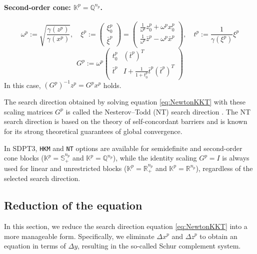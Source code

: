 \paragraph{Second-order cone: \(\mathbb{K}^p = \mathbb{Q}^{n_p}\).}
\begin{equation}
    \omega^p := \sqrt{\frac{\gamma(z^p)}{\gamma(x^p)}}, 
    \quad 
    \xi^p 
    := \begin{pmatrix} \xi^p_0 \\ \bar{\xi}^p \end{pmatrix} 
    = \begin{pmatrix}
        \frac{1}{\omega^p} z^p_0 + \omega^p x^p_0 \\
        \frac{1}{\omega^p} \bar{z}^p - \omega^p \bar{x}^p \\
    \end{pmatrix},
    \quad
    t^p := \frac{1}{\gamma(\xi^p)}\xi^p
    \label{eq:scaling_mat_NT_socp_aux}
\end{equation}
\begin{equation}
    G^p := \omega^p \begin{pmatrix}
        t^p_0 & (\bar{t}^p)^T \\
        \bar{t}^p & I+\frac{1}{1 + t^p_0} \bar{t}^p(\bar{t}^p)^T
    \end{pmatrix}
    \label{eq:scaling_mat_NT_socp}
\end{equation}
In this case, $(G^p)^{-1} z^p = G^p x^p$ holds.

\medskip 

The search direction obtained by solving equation \eqref{eq:NewtonKKT} with these scaling matrices $G^p$ is called the Nesterov--Todd (NT) search direction \cite{Nesterov1997,todd1998}. 
The NT search direction is based on the theory of self-concordant barriers and is known for its strong theoretical guarantees of global convergence.

\medskip 

In SDPT3, \texttt{HKM} and \texttt{NT} options are available for semidefinite and second-order cone blocks ($\mathbb{K}^p = \mathbb{S}^{n_p}_+$ and $\mathbb{K}^p = \mathbb{Q}^{n_p}$), while the identity scaling $G^p = I$ is always used for linear and unrestricted blocks ($\mathbb{K}^p = \mathbb{R}^{n_p}_+$ and $\mathbb{K}^p = \mathbb{R}^{n_p}$), regardless of the selected search direction.


\subsection{Reduction of the equation}
In this section, we reduce the search direction equation \eqref{eq:NewtonKKT} into a more manageable form. 
Specifically, we eliminate $\Delta x^p$ and $\Delta z^p$ to obtain an equation in terms of $\Delta y$, resulting in the so-called Schur complement system.

